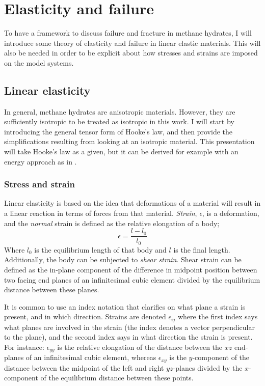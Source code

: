  \chapter{Elasticity and failure}
 To have a framework to discuss failure and fracture in methane hydrates, I will introduce some theory of elasticity and failure in linear elastic materials. This will also be needed in order to be explicit about how stresses and strains are imposed on the model systems.

 \section{Linear elasticity}
In general, methane hydrates are anisotropic materials. However, they are sufficiently isotropic to be treated as isotropic in this work. I will start by introducing the general tensor form of Hooke's law, and then provide the simplifications resulting from looking at an isotropic material. This presentation will take Hooke's law as a given, but it can be derived for example with an energy approach as in \citet[p.105]{Buehler2008}.

\subsection{Stress and strain}
Linear elasticity is based on the idea that deformations of a material will result in a linear reaction in terms of forces from that material. \emph{Strain}, $\epsilon$, is a deformation, and the \emph{normal} strain is defined as the relative elongation of a body;
\begin{equation}
	\epsilon = \frac{l-l_0}{l_0}
\end{equation}
Where $l_0$ is the equilibrium length of that body and $l$ is the final length. Additionally, the body can be subjected to \emph{shear strain}. Shear strain can be defined as the in-plane component of the difference in midpoint position between two facing end planes of an infinitesimal cubic element divided by the equilibrium distance between these planes.

It is common to use an index notation that clarifies on what plane a strain is present, and in which direction. Strains are denoted $\epsilon_{ij}$ where the first index says what planes are involved in the strain (the index denotes a vector perpendicular to the plane), and the second index says in what direction the strain is present. For instance: $\epsilon_{yy}$ is the relative elongation of the distance between the $xz$ end-planes of an infinitesimal cubic element, whereas $\epsilon_{xy}$ is the $y$-component of the distance between the midpoint of the left and right $yz$-planes divided by the $x$-component of the equilibrium distance between these points.

